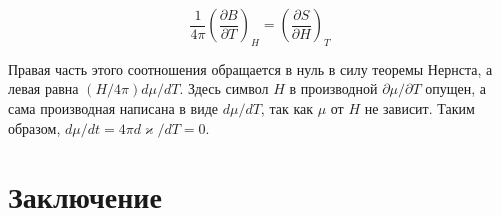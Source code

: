 \documentclass[12pt]{article}
\begin{document}
  \begin{equation}
  \frac{1}{4 \pi}\left(\frac{\partial B}{\partial T}\right)_H=\left(\frac{\partial S}{\partial H}\right)_T
  \end{equation}

  Правая часть этого соотношения обращается в нуль в силу теоремы Нернста, а левая равна $(H / 4 \pi) d \mu / d T$. Здесь символ $H$ в производной $\partial \mu / \partial T$ опущен, а сама производная написана в виде $d \mu / d T$, так как $\mu$ от $H$ не зависит. Таким образом, $d \mu / d t=4 \pi d \varkappa / d T=0$.

  \section{Заключение}

  
  
\end{document}
